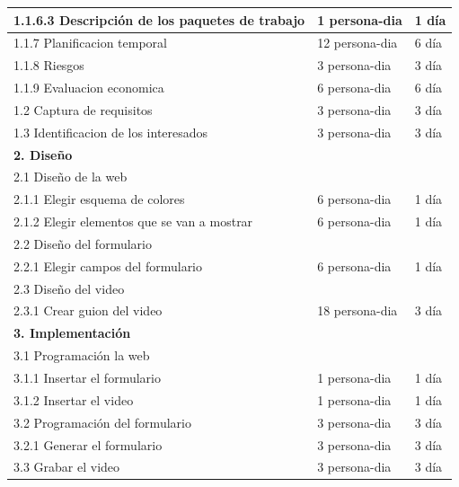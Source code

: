 \documentclass{report}
\begin{document}
\begin{center}
\begin{longtable}{|p{7cm}|p{3cm}|p{3cm}|}
                1.1.6.3 Descripción de los paquetes de trabajo & 1 persona-dia & 1 día\\
                \hline
                1.1.7 Planificacion temporal & 12 persona-dia & 6 día\\
                \hline
                1.1.8 Riesgos & 3 persona-dia & 3 día\\
                \hline
                1.1.9 Evaluacion economica & 6 persona-dia & 6 día\\
                \hline
                1.2 Captura de requisitos & 3 persona-dia & 3 día\\
                \hline
                1.3 Identificacion de los interesados & 3 persona-dia & 3 día\\
                \hline
                \textbf{2. Diseño} &  & \\
                \hline
                2.1 Diseño de la web &  & \\
                \hline
                2.1.1 Elegir esquema de colores & 6 persona-dia & 1 día\\
                \hline
                2.1.2 Elegir elementos que se van a mostrar & 6 persona-dia & 1 día\\
                \hline
                2.2 Diseño del formulario\\
                \hline
                2.2.1 Elegir campos del formulario & 6 persona-dia & 1 día\\
                \hline
                2.3 Diseño del video & & \\
                \hline
                2.3.1 Crear guion del video & 18 persona-dia & 3 día\\
                \hline
                \textbf{3. Implementación} &  & \\
                \hline
                3.1 Programación la web &  & \\
                \hline
                3.1.1 Insertar el formulario & 1 persona-dia & 1 día\\
                \hline
                3.1.2 Insertar el video & 1 persona-dia & 1 día\\
                \hline
                3.2 Programación del formulario & 3 persona-dia & 3 día\\
                \hline
                3.2.1 Generar el formulario & 3 persona-dia & 3 día\\
                \hline
                3.3 Grabar el video & 3 persona-dia & 3 día\\

\end{longtable}
\end{center}
\end{document}
